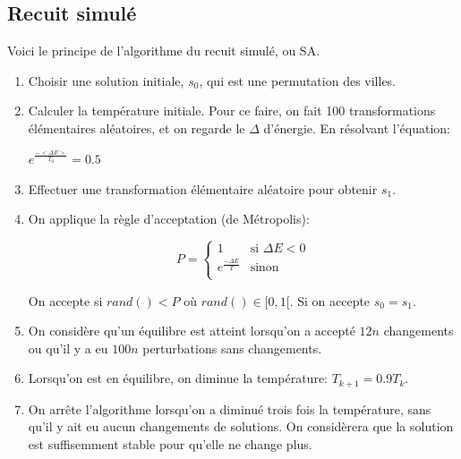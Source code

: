 \documentclass[a4paper, 11pt]{article}
\begin{document}
\subsection{Recuit simulé}
Voici le principe de l'algorithme du recuit simulé, ou SA.
\begin{enumerate}
 \item Choisir une solution initiale, $s_0$, qui est une permutation des villes.
 \item Calculer la température initiale. Pour ce faire, on fait 100 transformations élémentaires aléatoires, et on regarde le $\Delta$ d'énergie. En 
 résolvant l'équation:
 \begin{center}
  \begin{math}
   e^{\frac{-<\Delta E>}{T_0}} = 0.5
  \end{math}
 \end{center}
 
 \item Effectuer une transformation élémentaire aléatoire pour obtenir $s_1$.
 \item On applique la règle d'acceptation (de Métropolis):
 \begin{center}
  \begin{displaymath}
    P = 
    \left\lbrace
      \begin{array}{ll}
	1 & \text{si } \Delta E < 0 \\
	e^{\frac{-\Delta E}{T}} & \text{sinon } \\
      \end{array}
    \right.
\end{displaymath}
 \end{center}
 On accepte si $rand() < P$ où $rand() \in [0,1[$.
 Si on accepte $s_0 = s_1$.

 \item On considère qu'un équilibre est atteint lorsqu'on a accepté $12n$ changements ou qu'il y a eu $100n$ perturbations sans 
 changements.
 
 \item Lorsqu'on est en équilibre, on diminue la température: $T_{k+1} = 0.9 T_k$.
 
 \item On arrête l'algorithme lorsqu'on a diminué trois fois la température, sans qu'il y ait eu aucun changements de solutions. On 
 considèrera que la solution est suffisemment stable pour qu'elle ne change plus.

\end{enumerate}
\end{document}
